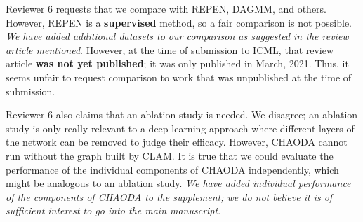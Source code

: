 \documentclass{article}
\begin{document}
Reviewer 6 requests that we compare with REPEN, DAGMM, and others.
However, REPEN is a \textbf{supervised} method, so a fair comparison is not possible.
\emph{We have added additional datasets to our comparison as suggested in the review article mentioned}.
However, at the time of submission to ICML, that review article \textbf{was not yet published}; it was only published in March, 2021.
Thus, it seems unfair to request comparison to work that was unpublished at the time of submission.

Reviewer 6 also claims that an ablation study is needed.
We disagree; an ablation study is only really relevant to a deep-learning approach where different layers of the network can be removed to judge their efficacy.
However, CHAODA cannot run without the graph built by CLAM.
It is true that we could evaluate the performance of the individual components of CHAODA independently, which might be analogous to an ablation study.
\emph{We have added individual performance of the components of CHAODA to the supplement; we do not believe it is of sufficient interest to go into the main manuscript}.
\end{document}
